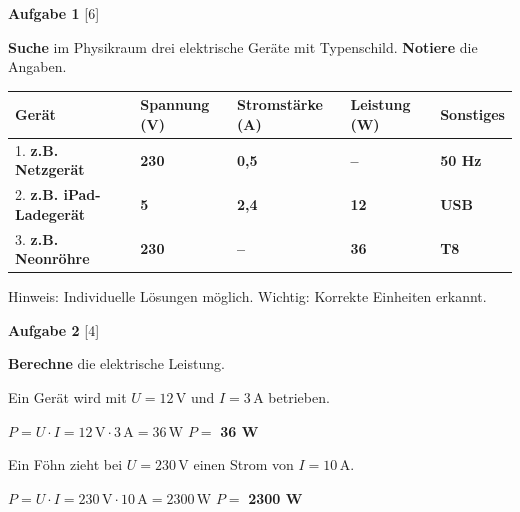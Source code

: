\documentclass[11pt, a4paper]{article}
\newif\ifzeigesternchen
\newcommand{\lsg}[1]{\textcolor{loesung}{\textbf{#1}}}
\newcommand{\punktebox}[1]{\hfill\small\textcolor{mittelgrau}{[#1]}}
\newcommand{\stern}[1]{\ifzeigesternchen\textsuperscript{\textcolor{fachfarbe}{(#1)}}\fi}
\newcommand{\aufgabe}[2]{%
    \needspace{4\baselineskip}%
    \vspace{10pt}%
    \noindent\textbf{\textcolor{fachfarbe}{Aufgabe #1}} #2%
    \vspace{4pt}%
    \nopagebreak[4]%
}
\newcommand{\operator}[1]{\textbf{\textcolor{fachfarbe}{#1}}}
\newcommand{\ein}[1]{\,\mathrm{#1}}
\begin{document}

\aufgabe{1}{\stern{*}} \punktebox{6}

\operator{Suche} im Physikraum drei elektrische Geräte mit Typenschild. \operator{Notiere} die Angaben.

\vspace{0.3em}
\renewcommand{\arraystretch}{1.6}
\begin{tabularx}{\linewidth}{|p{3.5cm}|X|X|X|X|}
\hline
\textbf{Gerät} & \textbf{Spannung (V)} & \textbf{Stromstärke (A)} & \textbf{Leistung (W)} & \textbf{Sonstiges} \\
\hline
1. \lsg{z.B. Netzgerät} & \lsg{230} & \lsg{0,5} & \lsg{–} & \lsg{50 Hz} \\
\hline
2. \lsg{z.B. iPad-Ladegerät} & \lsg{5} & \lsg{2,4} & \lsg{12} & \lsg{USB} \\
\hline
3. \lsg{z.B. Neonröhre} & \lsg{230} & \lsg{–} & \lsg{36} & \lsg{T8} \\
\hline
\end{tabularx}
\renewcommand{\arraystretch}{1.0}

\textcolor{loesung}{\small Hinweis: Individuelle Lösungen möglich. Wichtig: Korrekte Einheiten erkannt.}


\aufgabe{2}{\stern{*}} \punktebox{4}

\operator{Berechne} die elektrische Leistung.

\begin{teil}
    \item Ein Gerät wird mit $U = 12\ein{V}$ und $I = 3\ein{A}$ betrieben.

    \textcolor{loesung}{\small $P = U \cdot I = 12\ein{V} \cdot 3\ein{A} = 36\ein{W}$}
    \hfill $P = $ \lsg{36 W}

    \item Ein Föhn zieht bei $U = 230\ein{V}$ einen Strom von $I = 10\ein{A}$.

    \textcolor{loesung}{\small $P = U \cdot I = 230\ein{V} \cdot 10\ein{A} = 2300\ein{W}$}
    \hfill $P = $ \lsg{2300 W}
\end{teil}

\end{document}
